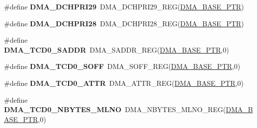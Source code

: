 \begin{DoxyCompactItemize}
\item 
\hypertarget{group___d_m_a___register___accessor___macros_ga54092d620f627c7c5177d67767fb27a8}{}\#define {\bfseries D\+M\+A\+\_\+\+D\+C\+H\+P\+R\+I29}~D\+M\+A\+\_\+\+D\+C\+H\+P\+R\+I29\+\_\+\+R\+E\+G(\hyperlink{group___d_m_a___peripheral_ga6997fbc1b1973e9f27170217a3bd6f22}{D\+M\+A\+\_\+\+B\+A\+S\+E\+\_\+\+P\+T\+R})\label{group___d_m_a___register___accessor___macros_ga54092d620f627c7c5177d67767fb27a8}

\item 
\hypertarget{group___d_m_a___register___accessor___macros_ga80b8f0c29ad7ed15e13daf2d9fe3d2bb}{}\#define {\bfseries D\+M\+A\+\_\+\+D\+C\+H\+P\+R\+I28}~D\+M\+A\+\_\+\+D\+C\+H\+P\+R\+I28\+\_\+\+R\+E\+G(\hyperlink{group___d_m_a___peripheral_ga6997fbc1b1973e9f27170217a3bd6f22}{D\+M\+A\+\_\+\+B\+A\+S\+E\+\_\+\+P\+T\+R})\label{group___d_m_a___register___accessor___macros_ga80b8f0c29ad7ed15e13daf2d9fe3d2bb}

\item 
\hypertarget{group___d_m_a___register___accessor___macros_ga84c95bf7de504481d8a778c6210c2dff}{}\#define {\bfseries D\+M\+A\+\_\+\+T\+C\+D0\+\_\+\+S\+A\+D\+D\+R}~D\+M\+A\+\_\+\+S\+A\+D\+D\+R\+\_\+\+R\+E\+G(\hyperlink{group___d_m_a___peripheral_ga6997fbc1b1973e9f27170217a3bd6f22}{D\+M\+A\+\_\+\+B\+A\+S\+E\+\_\+\+P\+T\+R},0)\label{group___d_m_a___register___accessor___macros_ga84c95bf7de504481d8a778c6210c2dff}

\item 
\hypertarget{group___d_m_a___register___accessor___macros_ga6cd045ae026df1eef839ebe090004da8}{}\#define {\bfseries D\+M\+A\+\_\+\+T\+C\+D0\+\_\+\+S\+O\+F\+F}~D\+M\+A\+\_\+\+S\+O\+F\+F\+\_\+\+R\+E\+G(\hyperlink{group___d_m_a___peripheral_ga6997fbc1b1973e9f27170217a3bd6f22}{D\+M\+A\+\_\+\+B\+A\+S\+E\+\_\+\+P\+T\+R},0)\label{group___d_m_a___register___accessor___macros_ga6cd045ae026df1eef839ebe090004da8}

\item 
\hypertarget{group___d_m_a___register___accessor___macros_gacd0b2fdf139a36d75c53d4865c9110ab}{}\#define {\bfseries D\+M\+A\+\_\+\+T\+C\+D0\+\_\+\+A\+T\+T\+R}~D\+M\+A\+\_\+\+A\+T\+T\+R\+\_\+\+R\+E\+G(\hyperlink{group___d_m_a___peripheral_ga6997fbc1b1973e9f27170217a3bd6f22}{D\+M\+A\+\_\+\+B\+A\+S\+E\+\_\+\+P\+T\+R},0)\label{group___d_m_a___register___accessor___macros_gacd0b2fdf139a36d75c53d4865c9110ab}

\item 
\hypertarget{group___d_m_a___register___accessor___macros_ga6df3a3da857eb88f77c73070f6724e5b}{}\#define {\bfseries D\+M\+A\+\_\+\+T\+C\+D0\+\_\+\+N\+B\+Y\+T\+E\+S\+\_\+\+M\+L\+N\+O}~D\+M\+A\+\_\+\+N\+B\+Y\+T\+E\+S\+\_\+\+M\+L\+N\+O\+\_\+\+R\+E\+G(\hyperlink{group___d_m_a___peripheral_ga6997fbc1b1973e9f27170217a3bd6f22}{D\+M\+A\+\_\+\+B\+A\+S\+E\+\_\+\+P\+T\+R},0)\label{group___d_m_a___register___accessor___macros_ga6df3a3da857eb88f77c73070f6724e5b}


\end{DoxyCompactItemize}
